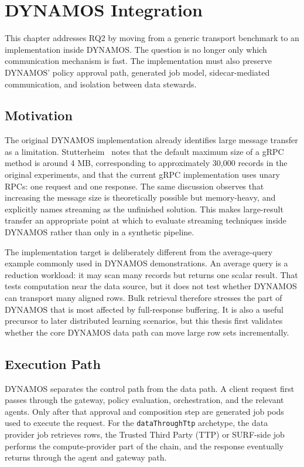 \chapter{DYNAMOS Integration}\label{ch:dynamos-integration}

This chapter addresses RQ2 by moving from a generic transport benchmark to an implementation inside DYNAMOS. The question is no longer only which communication mechanism is fast. The implementation must also preserve DYNAMOS' policy approval path, generated job model, sidecar-mediated communication, and isolation between data stewards.

\section{Motivation}

The original DYNAMOS implementation already identifies large message transfer as a limitation. Stutterheim~\cite{stutterheim2023thesis} notes that the default maximum size of a gRPC method is around 4 MB, corresponding to approximately 30{,}000 records in the original experiments, and that the current gRPC implementation uses unary RPCs: one request and one response. The same discussion observes that increasing the message size is theoretically possible but memory-heavy, and explicitly names streaming as the unfinished solution. This makes large-result transfer an appropriate point at which to evaluate streaming techniques inside DYNAMOS rather than only in a synthetic pipeline.

The implementation target is deliberately different from the average-query example commonly used in DYNAMOS demonstrations. An average query is a reduction workload: it may scan many records but returns one scalar result. That tests computation near the data source, but it does not test whether DYNAMOS can transport many aligned rows. Bulk retrieval therefore stresses the part of DYNAMOS that is most affected by full-response buffering. It is also a useful precursor to later distributed learning scenarios, but this thesis first validates whether the core DYNAMOS data path can move large row sets incrementally.

\section{Execution Path}

DYNAMOS separates the control path from the data path. A client request first passes through the gateway, policy evaluation, orchestration, and the relevant agents. Only after that approval and composition step are generated job pods used to execute the request. For the \texttt{dataThroughTtp} archetype, the data provider job retrieves rows, the Trusted Third Party (TTP) or SURF-side job performs the compute-provider part of the chain, and the response eventually returns through the agent and gateway path.

